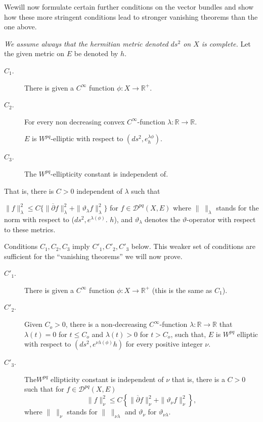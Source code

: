 We\pageoriginale will now formulate certain further conditions on the
vector bundles and show how these more stringent conditions lead to
stronger vanishing theorems than the one above.  

\textit{We assume always that the hermitian metric denoted $ds^2$ on $X$ is
complete.} Let the given metric on $E$ be denoted by $h$.   

\begin{description} 
\item[$C_1$.] There is given a $ C^{\infty}$ function
  $\phi: X\rightarrow \mathbb{R}^+$. 

\item[$C_2$.] For every non decreasing convex $C^{\infty}$-function
  $\lambda: \mathbb{R} \rightarrow \mathbb{R}$.  

  $E$ is $W^{pq}$-elliptic with respect to $(ds^2, e^{\lambda
  \phi}_h)$.

\item[$C_3$.] The $W^{pq}$-ellipticity constant is independent of.
\end{description}

That is, there is $C > 0$ independent of $\lambda$ such that

$\parallel f \parallel^2_\lambda \leqslant C \bigg\{{\parallel
  \overline {\partial} f\parallel^2_\lambda + \parallel
  \vartheta_\lambda f\parallel^2_\lambda}\bigg\}$ for $f \in
\mathscr{D}^{pq} (X,E)$ where $\parallel \; \parallel_\lambda$ stands for
the norm with respect to ($ds^2, e^{\lambda(\phi)}$. 
$h$), and $\vartheta_\lambda$ denotes the $\vartheta$-operator with
respect to these metrics.  

Conditions $C_1, C_2, C_3$ imply $ C'_1,
C'_2, C'_3$ below.  This weaker set of conditions are sufficient
for the ``vanishing theorems'' we will now prove. 

\begin{description} 
\item[$C'_1$.] There is given a $C^\infty$ function
  $\phi: X\rightarrow \mathbb{R}^+$ (this is the same as $C_1$).  

\item[$C'_2$.] Given $C_o>0$, there is a non-decreasing
  $C^\infty$-function $\lambda:\mathbb{R} \rightarrow \mathbb{R}$
  that $\lambda(t)=0$ for $t\leqslant C_o$ and
  $\lambda(t)> 0$ for $t > C_o$, such that, $E$ is
  $W^{pq}$ elliptic with respect to $(ds^2,e^{\nu\lambda(\phi)} h)$
  for every positive integer $\nu$.  

\item[${ C'_3}$.] The\pageoriginale $W^{pq}$ ellipticity constant is
  independent of $\nu$ that is, there is a $C > 0$ such that for $f
  \in \mathscr{D}^{pq}(X,E)$ 
  $$ 
  \parallel f \parallel^2_\nu \leq C \left\{{\parallel \overline
    {\partial} f\parallel^2_\nu + \parallel\vartheta_\nu
    f\parallel^2_\nu}\right\},
  $$
  where $\parallel \; \parallel_\nu$ stands for $\parallel \;
  \parallel_{\nu \lambda}$ and $\vartheta_\nu$ for $\vartheta_{\nu
    \lambda}$. 
\end{description}

